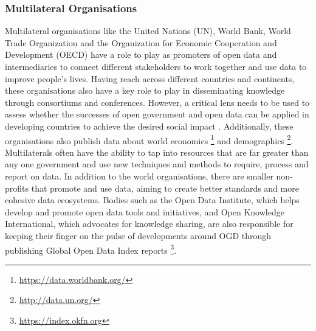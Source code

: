 \subsubsection{Multilateral Organisations}
Multilateral organisations \citep[ch. 28]{davies_open_2010} like the United Nations (UN), World Bank, World Trade Organization and the Organization for Economic Cooperation and Development (OECD) have a role to play as promoters of open data and intermediaries to connect different stakeholders to work together and use data to improve people's lives. Having reach across different countries and continents, these organisations also have a key role to play in disseminating knowledge through consortiums and conferences. However, a critical lens needs to be used to assess whether the successes of open government and open data can be applied in developing countries to achieve the desired social impact \citep{gigler_realizing_2011}. Additionally, these organisations also publish data about world economics \footnote{\url{https://data.worldbank.org/}} and demographics \footnote{\url{http://data.un.org/}}. Multilaterals often have the ability to tap into resources that are far greater than any one government and use new techniques and methods to require, process and report on data. In addition to the world organisations, there are smaller non-profits that promote and use data, aiming to create better standards and more cohesive data ecosystems. Bodies such as the Open Data Institute, which helps develop and promote open data tools and initiatives, and Open Knowledge International, which advocates for knowledge sharing, are also responsible for keeping their finger on the pulse of developments around OGD through publishing Global Open Data Index reports \footnote{\url{https://index.okfn.org}}.

